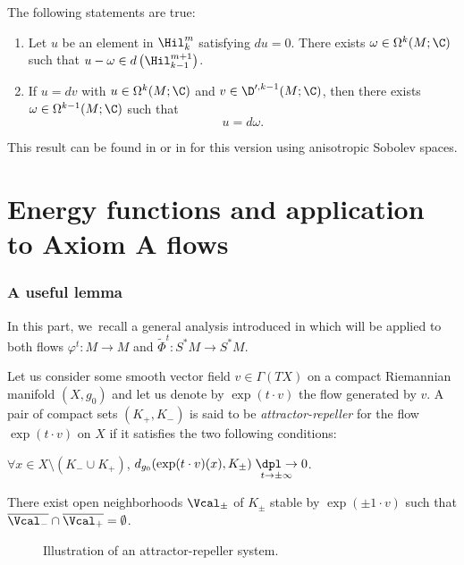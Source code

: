 \begin{thm}[de~Rham]\label{thm: de Rham} The following statements are true:
\begin{enumerate}
\item Let $u$ be an element in $\Hil_k^m$ satisfying $d u = 0$. There exists $\omega \in \Omega^k (M; \C)$ such that $u - \omega \in d\left(\Hil_{k-1}^{m+1} \right)$.
\item If $u = d v$ with $u \in \Omega^k (M; \C)$ and $v \in \D'^{,k-1} (M; \C)$, then there exists $\omega \in \Omega^{k-1} (M; \C)$ such that
\[
u = d \omega.
\]
\end{enumerate}
\end{thm}

This result can be found in \cite[p.\,355]{schwartz} or in \cite[p.\,16]{DRIII} for this version using anisotropic Sobolev spaces.

\label{section: proof of isomorphism theorem}

\section{Energy functions and application to Axiom A flows}\label{section: Dynamical proofs}

\subsubsection{A useful lemma}\label{subsubsection: a useful lemma} In this part, we~recall a general analysis introduced in \cite{FS} which will be applied to both flows $\varphi^t: M \to M$ and $\widetilde{\Phi}^t: S^* M \to S^* M$.

Let us consider some smooth vector field $v \in \Gamma (TX)$ on a compact Riemannian manifold $(X,g_0)$ and let us denote by $\exp (t\cdot v)$ the flow generated by $v$. A pair of compact sets $(K_+,K_-)$ is said to be \emph{attractor-repeller} for the flow $\exp (t\cdot v)$ on $X$ if it satisfies the two following conditions:
\begin{enumeratei}
\item $\forall x \in X \setminus (K_- \cup K_+)$, $d_{g_0}(\exp (t\cdot v) (x), K_{\pm}) \underset{t \to \pm \infty}{\dpl\to} 0$.
\item There exist open neighborhoods $\Vcal_{\pm}$ of $K_{\pm}$ stable by $\exp (\pm 1\cdot v)$ such that $\overline{\Vcal_{-}} \cap \overline{\Vcal_{+}} = \emptyset$.
\end{enumeratei}

\begin{figure}[!t]
\centering
\def\svgscale{0.7}

\caption{Illustration of an attractor-repeller system.}
\label{fig: attractor-repeller model}
\end{figure}


